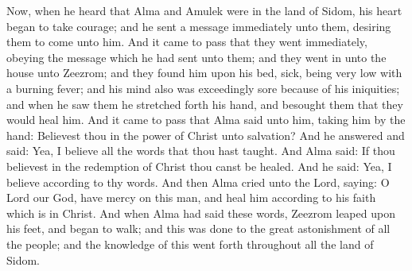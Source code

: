 \bverse \iffalse Now, when he heard that Alma and Amulek were in the land of Sidom, his heart began to take courage; and he sent a message immediately unto them, desiring them to come unto him. \fi
Now, when he heard that Alma and Amulek were in the land of Sidom, his heart began to take courage; and he sent a message immediately unto them, desiring them to come unto him.
\bverse \iffalse And it came to pass that they went immediately, obeying the message which he had sent unto them; and they went in unto the house unto Zeezrom; and they found him upon his bed, sick, being very low with a burning fever; and his mind also was exceedingly sore because of his iniquities; and when he saw them he stretched forth his hand, and besought them that they would heal him. \fi
And it came to pass that they went immediately, obeying the message which he had sent unto them; and they went in unto the house unto Zeezrom; and they found him upon his bed, sick, being very low with a burning fever; and his mind also was exceedingly sore because of his iniquities; and when he saw them he stretched forth his hand, and besought them that they would heal him.
\bverse \iffalse And it came to pass that Alma said unto him, taking him by the hand: Believest thou in the power of Christ unto salvation? \fi
And it came to pass that Alma said unto him, taking him by the hand: Believest thou in the power of Christ unto salvation?
\bverse \iffalse And he answered and said: Yea, I believe all the words that thou hast taught. \fi
And he answered and said: Yea, I believe all the words that thou hast taught.
\bverse \iffalse And Alma said: If thou believest in the redemption of Christ thou canst be healed. \fi
And Alma said: If thou believest in the redemption of Christ thou canst be healed.
\bverse \iffalse And he said: Yea, I believe according to thy words. \fi
And he said: Yea, I believe according to thy words.
\bverse \iffalse And then Alma cried unto the Lord, saying: O Lord our God, have mercy on this man, and heal him according to his faith which is in Christ. \fi
And then Alma cried unto the Lord, saying: O Lord our God, have mercy on this man, and heal him according to his faith which is in Christ.
\bverse \iffalse And when Alma had said these words, Zeezrom leaped upon his feet, and began to walk; and this was done to the great astonishment of all the people; and the knowledge of this went forth throughout all the land of Sidom. \fi
And when Alma had said these words, Zeezrom leaped upon his feet, and began to walk; and this was done to the great astonishment of all the people; and the knowledge of this went forth throughout all the land of Sidom.
